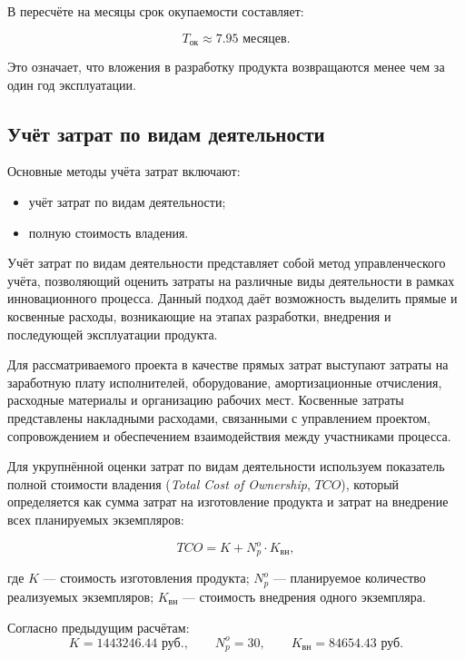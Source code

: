 В пересчёте на месяцы срок окупаемости составляет:

\begin{equation}
T_{\text{ок}} \approx 7.95 \text{ месяцев}.
\end{equation}

Это означает, что вложения в разработку продукта возвращаются менее
чем за один год эксплуатации.

\subsection*{Учёт затрат по видам деятельности}

Основные методы учёта затрат включают:
\begin{itemize}
\item учёт затрат по видам деятельности;
\item полную стоимость владения.
\end{itemize}

Учёт затрат по видам деятельности представляет собой метод
управленческого учёта, позволяющий оценить затраты на различные виды
деятельности в рамках инновационного процесса. Данный подход даёт
возможность выделить прямые и косвенные расходы, возникающие на этапах
разработки, внедрения и последующей эксплуатации продукта.

Для рассматриваемого проекта в качестве прямых затрат выступают
затраты на заработную плату исполнителей, оборудование,
амортизационные отчисления, расходные материалы и организацию рабочих
мест. Косвенные затраты представлены накладными расходами, связанными
с управлением проектом, сопровождением и обеспечением взаимодействия
между участниками процесса.

Для укрупнённой оценки затрат по видам деятельности используем
показатель полной стоимости владения (\textit{Total Cost of Ownership},
$TCO$), который определяется как сумма затрат на изготовление продукта
и затрат на внедрение всех планируемых экземпляров:

\begin{equation}
TCO = K + N_p^o \cdot K_{\text{вн}},
\end{equation}

где $K$ --- стоимость изготовления продукта;
$N_p^o$ --- планируемое количество реализуемых экземпляров;
$K_{\text{вн}}$ --- стоимость внедрения одного экземпляра.

Согласно предыдущим расчётам:
\[
K = 1443246.44 \text{ руб.},
\qquad
N_p^o = 30,
\qquad
K_{\text{вн}} = 84654.43 \text{ руб.}
\]

